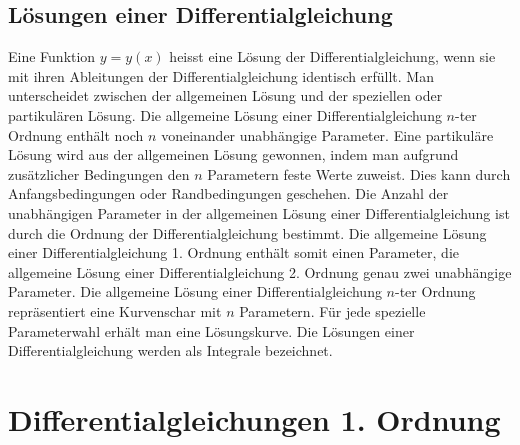 \subsection{Lösungen einer Differentialgleichung}
Eine Funktion $y=y\left(x\right)$ heisst eine Lösung der Differentialgleichung, wenn sie mit ihren Ableitungen der Differentialgleichung identisch erfüllt. Man unterscheidet zwischen der allgemeinen Lösung und der speziellen oder partikulären Lösung. Die allgemeine Lösung einer Differentialgleichung $n$-ter Ordnung enthält noch $n$ voneinander unabhängige Parameter. Eine partikuläre Lösung wird aus der allgemeinen Lösung gewonnen, indem man aufgrund zusätzlicher Bedingungen den $n$ Parametern feste Werte zuweist. Dies kann durch Anfangsbedingungen oder Randbedingungen geschehen. 
\newline \newline
Die Anzahl der unabhängigen Parameter in der allgemeinen Lösung einer Differentialgleichung ist durch die Ordnung der Differentialgleichung bestimmt. Die allgemeine Lösung einer Differentialgleichung 1. Ordnung enthält somit einen Parameter, die allgemeine Lösung einer Differentialgleichung 2. Ordnung genau zwei unabhängige Parameter.
\newline\newline
Die allgemeine Lösung einer Differentialgleichung $n$-ter Ordnung repräsentiert eine Kurvenschar mit $n$ Parametern. Für jede spezielle Parameterwahl erhält man eine Lösungskurve. Die Lösungen einer Differentialgleichung werden als Integrale bezeichnet.
\section{Differentialgleichungen 1. Ordnung}
